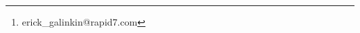 \documentclass[11pt]{article}
\begin{document}
\title{}
\author{Erick Galinkin\thanks{erick_galinkin@rapid7.com}}
\date{\today}

\maketitle



%
\end{document}

